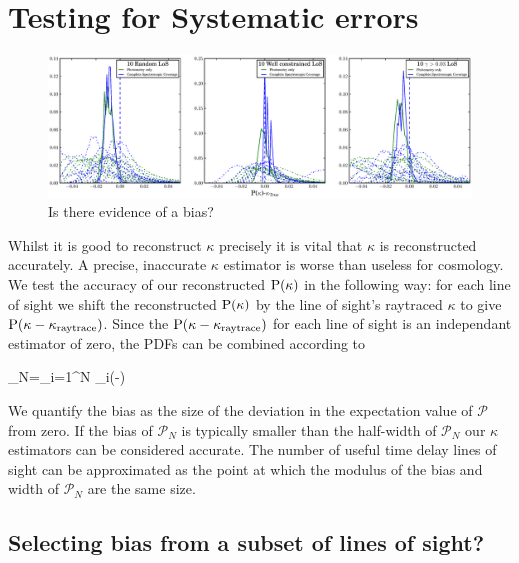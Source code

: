 \documentclass[useAMS,usenatbib]{mn2e}
\begin{document}


\section{Testing for Systematic errors}
\begin{figure}
\includegraphics[width=\textwidth]{figs/biascheck.eps}
\caption[magcut]{Is there evidence of a bias?}
\label{fig:where}
\end{figure}

Whilst it is good to reconstruct $\kappa$ precisely it is vital that $\kappa$ is reconstructed accurately. A precise, inaccurate $\kappa$ estimator is worse than useless for cosmology. We test the accuracy of our reconstructed ${\rm P}(\kappa)$ in the following way: for each line of sight we shift the reconstructed ${\rm P}(\kappa)$ by the line of sight's raytraced $\kappa$ to give ${\rm P}(\kappa-\kappa_{\rm raytrace})$. Since the ${\rm P}(\kappa-\kappa_{\rm raytrace})$ for each line of sight is an independant estimator of zero, the PDFs can be combined according to

\be
\label{eq:bias}
_N=\prod_{i=1}^N \pr_i(\kappa-\kapparay)
\ee

We quantify the bias as the size of the deviation in the expectation value of $\mathcal{P}$ from zero. If the bias of $\mathcal{P}_N$ is typically smaller than the half-width of $\mathcal{P}_N$ our $\kappa$ estimators can be considered accurate. The number of useful time delay lines of sight can be approximated as the point at which the modulus of the bias and width of $\mathcal{P}_N$ are the same size.

\subsection{Selecting bias from a subset of lines of sight?}
\end{document}
